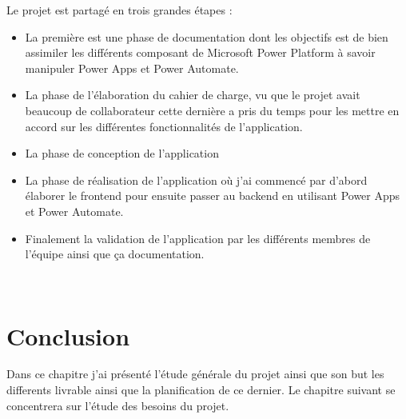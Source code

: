 \newpage
Le projet est partagé en trois grandes étapes : 
\\
\begin{itemize}
  \item La première est une phase de documentation dont les objectifs est de bien assimiler les différents composant de Microsoft Power Platform à savoir manipuler Power Apps et Power Automate.
  \item La phase de l'élaboration du cahier de charge, vu que le projet avait beaucoup de collaborateur cette dernière a pris du temps pour les mettre en accord sur les différentes fonctionnalités de l'application.
  \item La phase de conception de l'application
  \item La phase de réalisation de l'application où j'ai commencé par d'abord élaborer le frontend pour ensuite passer au backend en utilisant Power Apps et Power Automate.
  \item Finalement la validation de l'application par les différents membres de l'équipe ainsi que ça documentation.
\end{itemize}
\\
\section{Conclusion}

Dans ce chapitre j’ai présenté l’étude générale du projet ainsi que son but les differents livrable ainsi que la planification de ce dernier. Le chapitre suivant se concentrera sur l’étude des besoins du
projet.
